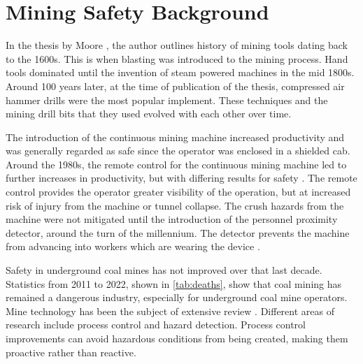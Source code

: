 \chapter{
Mining Safety Background
\label{chap:2}}

In the thesis by Moore \cite{11124/16423}, the author outlines history of mining tools
dating back to the 1600s. This is when blasting was introduced to the mining process.
Hand tools dominated until the invention of steam powered machines in the mid 1800s.
Around 100 years later, at the time of publication of the thesis, compressed air hammer drills
were the most popular implement. These techniques and the mining drill bits that they used
evolved with each other over time.

The introduction of the continuous mining machine increased productivity and 
was generally regarded as safe since the operator was enclosed in a shielded cab.
Around the 1980s, the remote control for the continuous mining machine led to 
further increases in productivity, but with differing results for safety \cite{KONONOV199521}.
The remote control provides the operator greater visibility of the operation, 
but at increased risk of injury from the machine or tunnel collapse.
The crush hazards from the machine were not mitigated until the introduction of the
personnel proximity detector, around the turn of the millennium.
The detector prevents the machine from advancing into 
workers which are wearing the device \cite{schiffbauer2001active}.

Safety in underground coal mines has not improved over that last decade.
Statistics from 2011 to 2022, shown in \ref{tab:deaths},
show that coal mining has remained a dangerous industry,
especially for underground coal mine operators.
Mine technology has been the subject of extensive review 
\cite{ijerph19042334, 7784796, RALSTON2014305, molaei:hal-02940030}.
Different areas of research include process control and hazard detection.
Process control improvements can avoid hazardous conditions from being created,
making them proactive rather than reactive.

